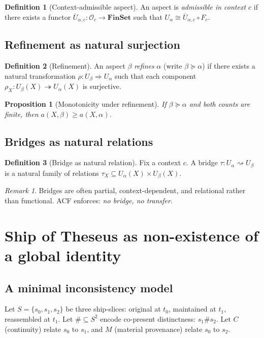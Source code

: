 \documentclass[11pt]{article}
\theoremstyle{definition}
\newtheorem{definition}{Definition}[section]
\theoremstyle{plain}
\newtheorem{proposition}{Proposition}[section]
\theoremstyle{remark}
\newtheorem{remark}{Remark}[section]
\newcommand{\FinSet}{\mathbf{FinSet}}
\begin{document}
\begin{definition}[Context-admissible aspect]
An aspect is \emph{admissible in context $c$} if there exists a functor
$\overline U_{\alpha,c}:\mathcal O_c\to\FinSet$ such that
$U_\alpha\cong \overline U_{\alpha,c}\circ F_c$.
\end{definition}

\subsection{Refinement as natural surjection}
\begin{definition}[Refinement]
An aspect $\beta$ \emph{refines} $\alpha$ (write $\beta\succeq\alpha$) if there exists a natural transformation
$\rho:U_\beta\Rightarrow U_\alpha$ such that each component $\rho_X:U_\beta(X)\twoheadrightarrow U_\alpha(X)$ is surjective.
\end{definition}

\begin{proposition}[Monotonicity under refinement]
If $\beta\succeq\alpha$ and both counts are finite, then $a(X,\beta)\ge a(X,\alpha)$.
\end{proposition}

\subsection{Bridges as natural relations}
\begin{definition}[Bridge as natural relation]\label{def:bridge}
Fix a context $c$. A bridge $\tau:U_\alpha \rightsquigarrow U_\beta$ is a natural family of relations
$\tau_X\subseteq U_\alpha(X)\times U_\beta(X)$.
\end{definition}

\begin{remark}
Bridges are often partial, context-dependent, and relational rather than functional. ACF enforces: \emph{no bridge, no transfer}.
\end{remark}

\section{Ship of Theseus as non-existence of a global identity}
\subsection{A minimal inconsistency model}
Let $S=\{s_0,s_1,s_2\}$ be three ship-slices: original at $t_0$, maintained at $t_1$, reassembled at $t_1$.
Let $\#\subseteq S^2$ encode co-present distinctness: $s_1\# s_2$.
Let $C$ (continuity) relate $s_0$ to $s_1$, and $M$ (material provenance) relate $s_0$ to $s_2$.
\end{document}
